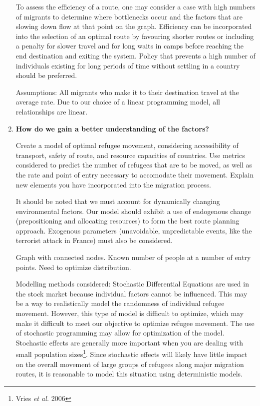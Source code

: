 \documentclass{article}
\begin{document}
\begin{enumerate}
    To assess the efficiency of a route, one may consider a case with high numbers of migrants to determine where bottlenecks occur and the factors that are slowing down flow at that point on the graph. Efficiency can be incorporated into the selection of an optimal route by favouring shorter routes or including a penalty for slower travel and for long waits in camps before reaching the end destination and exiting the system. Policy that prevents a high number of individuals existing for long periods of time without settling in a country should be preferred.

    Assumptions: All migrants who make it to their destination travel at the average rate. Due to our choice of a linear programming model, all relationships are linear. 

    \item {\bf How do we gain a better understanding of the factors?}

    Create a model of optimal refugee movement, considering accessibility of transport, safety of route, and resource capacities of countries. Use metrics considered to predict the number of refugees that are to be moved, as well as the rate and point of entry necessary to accomodate their movement. Explain new elements you have incorporated into the migration process.

    It should be noted that we must account for dynamically changing environmental factors. Our model should exhibit a use of endogenous change (prepositioning and allocating resources) to form the best route planning approach. Exogenous parameters (unavoidable, unpredictable events, like the terrorist attack in France) must also be considered.

    Graph with connected nodes. Known number of people at a number of entry points. Need to optimize distribution.

    Modelling methods considered:
    Stochastic Differential Equations are used in the stock market because individual factors cannot be influenced. This may be a way to realistically model the randomness of individual refugee movement. However, this type of model is difficult to optimize, which may make it difficult to meet our objective to optimize refugee movement. The use of stochastic programming may allow for optimization of the model. Stochastic effects are generally more important when you are dealing with small population sizes\footnote{Vries {\em et al.} 2006}. Since stochastic effects will likely have little impact on the overall movement of large groups of refugees along major migration routes, it is reasonable to model this situation using deterministic models. 


\end{enumerate}
\end{document}
